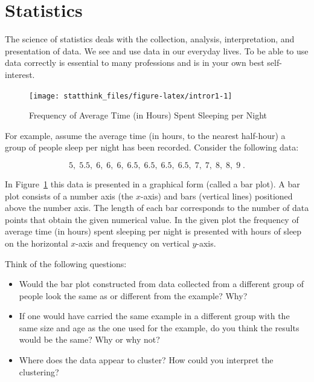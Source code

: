 \documentclass[]{krantz}
\theoremstyle{definition}
\theoremstyle{definition}
\theoremstyle{definition}
\theoremstyle{remark}
\begin{document}
\section{Statistics}\label{statistics}

The science of statistics deals with the collection, analysis,
interpretation, and presentation of data. We see and use data in our
everyday lives. To be able to use data correctly is essential to many
professions and is in your own best self-interest.

\begin{figure}

{\centering \texttt{[image: statthink\_files/figure-latex/intror1-1]} 

}

\caption{Frequency of Average Time (in Hours) Spent Sleeping per Night}\label{fig:intror1}
\end{figure}

For example, assume the average time (in hours, to the nearest
half-hour) a group of people sleep per night has been recorded. Consider
the following data:

\[5,\; 5.5,\; 6,\; 6,\; 6,\; 6.5,\; 6.5,\; 6.5,\; 6.5,\; 7,\; 7,\; 8,\; 8,\; 9\;.\]

In Figure~\ref{fig:intror1} this data is presented in a graphical form
(called a bar plot). A bar plot consists of a number axis (the
\(x\)-axis) and bars (vertical lines) positioned above the number axis.
The length of each bar corresponds to the number of data points that
obtain the given numerical value. In the given plot the frequency of
average time (in hours) spent sleeping per night is presented with hours
of sleep on the horizontal \(x\)-axis and frequency on vertical
\(y\)-axis.

Think of the following questions:

\begin{itemize}
\item
  Would the bar plot constructed from data collected from a different
  group of people look the same as or different from the example? Why?
\item
  If one would have carried the same example in a different group with
  the same size and age as the one used for the example, do you think
  the results would be the same? Why or why not?
\item
  Where does the data appear to cluster? How could you interpret the
  clustering?
\end{itemize}
\end{document}
